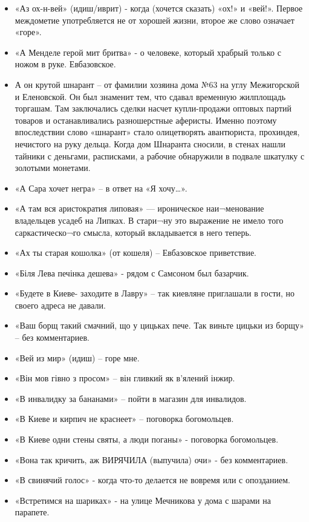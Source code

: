 \begin{itemize}
\item  «Аз ох-н-вей» (идиш/иврит) -  когда (хочется сказать) «ох!» и «вей!». Первое междометие употребляется не от хорошей жизни, второе же слово означает «горе». 
\item  «А Менделе герой мит бритва» - о человеке, который храбрый только с ножом в руке. Евбазовское.
\item  А он крутой шнарант – от фамилии хозяина дома №63 на углу Межигорской и Еленовской. Он был знаменит тем, что сдавал временную жилплощадь торгашам. Там заключались сделки насчет купли-продажи оптовых партий товаров и останавливались разношерстные аферисты. Именно поэтому впоследствии слово «шнарант» стало олицетворять авантюриста, прохиндея, нечистого на руку дельца. Когда дом Шнаранта сносили, в стенах нашли тайники с деньгами, расписками, а рабочие обнаружили в подвале шкатулку с золотыми монетами.
\item  «А Сара хочет негра» – в ответ на «Я хочу…».
\item  «А там вся аристократия липовая» — ироническое наи¬менование владельцев усадеб на Липках. В стари¬ну это выражение не имело того саркастическо¬го смысла, который вкладывается в него теперь.
\item  «Ах ты старая кошолка» (от кошеля) – Евбазовское приветствие.
\item  «Біля Лева печінка дешева» - рядом с Самсоном был базарчик.
\item  «Будете в Киеве- заходите в Лавру» – так киевляне приглашали в гости, но своего адреса не давали.
\item  «Ваш борщ такий смачний, що у цицьках пече. Так виньте цицьки из борщу» – без комментариев.
\item  «Вей из мир» (идиш) – горе мне.
\item  «Він мов гівно з просом» – він гливкий як в’ялений інжир. 
\item  «В инвалидку за бананами» – пойти в магазин для инвалидов.
\item  «В Киеве и кирпич не краснеет» – поговорка богомольцев. 
\item  «В Киеве одни стены святы, а люди поганы» - поговорка богомольцев.
\item  «Вона так кричить, аж ВИРЯЧИЛА (выпучила) очи» - без комментариев.
\item  «В свинячий голос» - когда что-то делается не вовремя или с опозданием.
\item  «Встретимся на шариках» - на улице Мечникова у дома с шарами на парапете. 

\end{itemize}
